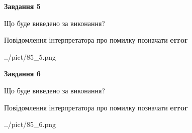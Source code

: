 \documentclass[12pt, ukrainian]{article}
\begin{document}
{{\begin {center}\textbf{Завдання 5}\end {center}}\par
Що буде виведено за виконання? \par
Повідомлення інтерпретатора про помилку позначати \textbf{error}

\begin{center}
	{../pict/85_5.png}
\end{center}
\newpage

{\begin {center}\textbf{Завдання 6}\end {center}}\par
Що буде виведено за виконання? \par
Повідомлення інтерпретатора про помилку позначати \textbf{error}

\begin{center}
	{../pict/85_6.png}
\end{center}
\newpage

}
\end{document}
